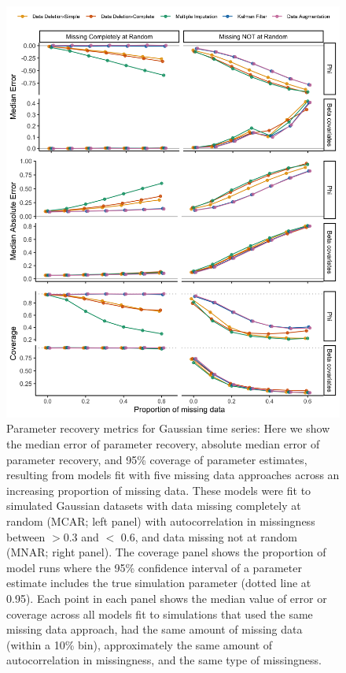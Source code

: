 \documentclass{article}
\begin{document}
\begin{figure}
    \noindent\includegraphics[width = .7\textwidth]{Figures/MockedUpFigures/parameterRecoveryGaussian_MARMNARlong.png}
    \caption{Parameter recovery metrics for Gaussian time series: Here we show the median error of parameter recovery, absolute median error of parameter recovery, and 95\% coverage of parameter estimates, resulting from models fit with five missing data approaches across an increasing proportion of missing data. 
    These models were fit to simulated Gaussian datasets with data missing completely at random (MCAR; left panel) with autocorrelation in missingness between $>$0.3 and $<$ 0.6, and data missing not at random (MNAR; right panel). The coverage panel shows the proportion of model runs where the 95\% confidence interval of a parameter estimate includes the true simulation parameter (dotted line at 0.95). Each point in each panel shows the median value of error or coverage across all models fit to simulations that used the same missing data approach, had the same amount of missing data (within a 10\% bin), approximately the same amount of autocorrelation in missingness, and the same type of missingness.} 

    \label{fig:ParamRec_Gauss}
\end{figure}
\end{document}
